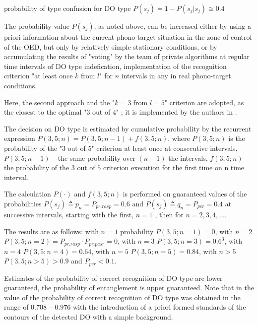 probability of type confusion for DO type $P(s_j) = 1 - P(s_j | s_j) \cong 0.4$

The probability value $P(s_j)$, as noted above, can be increased either by using a priori information about the current phono-target situation in the zone of control of the OED, but only by relatively simple stationary conditions, or by accumulating the results of "voting" by the team of private algorithms at regular time intervals of DO type indefication, implementation of the recognition criterion "at least once $k$ from $l$" for $n$ intervals \cite{bib_20,bib_21} in any in real phono-target conditions.

Here, the second approach and the "$k = 3$ from $l = 5$" criterion are adopted, as the closest to the optimal "$3$ out of $4$" \cite{bib_22}; it is implemented by the authors in \cite{bib_01}.

The decision on DO type is estimated by cumulative probability by the recurrent expression \cite{bib_22} $P(3, 5; n) = P(3, 5; n - 1) + f(3, 5; n)$, where $P(3, 5; n)$ is the probability of the "$3$ out of $5$" criterion at least once at consecutive intervals, $P(3, 5; n - 1)$ -- the same probability over $(n - 1)$ the intervals, $f(3, 5; n)$ the probability of the $3$ out of $5$ criterion execution for the first time on n time interval.

The calculation $P(\cdot)$ and $f(3, 5; n)$ is performed on guaranteed values of the probabilities $P(s_j) \triangleq p_n = P_{pr.rasp} = 0.6$ and $P(s_j) \triangleq q_n = P_{per} = 0.4$ at successive intervals, starting with the first, $n = 1$ , then for $n = 2, 3, 4, \dots$.
  
The results are as follows: with $n = 1$ probability $P(3, 5; n = 1) = 0$, with $n = 2$ $P(3, 5; n = 2) = P_{pr.rasp} \cdot P_{pr.pasr} = 0$, with $n = 3$ $P(3, 5; n = 3) = 0.6^3$, with $n = 4$ $P(3, 5; n = 4) = 0.64$, with $n = 5$ $P(3, 5; n = 5) = 0.84$, with $n > 5$ $P(3, 5; n > 5) > 0.9$ and $P_{per} < 0.1$.
 
Estimates of the probability of correct recognition of DO type are lower guaranteed, the probability of entanglement is upper guaranteed. Note that in \cite{bib_22} the value of the probability of correct recognition of DO type was obtained in the range of $0.708$ -- $0.976$ with the introduction of a priori formed standards of the contours of the detected DO with a simple background.
